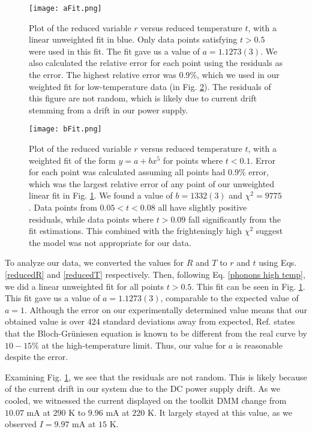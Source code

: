 \documentclass[11pt,letterpaper]{article}
\begin{document}
\begin{figure}
\centerline{\texttt{[image: aFit.png]}}
\caption{Plot of the reduced variable $r$ versus reduced temperature $t$, with a linear unweighted fit in blue. Only data points satisfying $t > 0.5$ were used in this fit. The fit gave us a value of $a = 1.1273(3)$. We also calculated the relative error for each point using the residuals as the error. The highest relative error was $0.9\%$, which we used in our weighted fit for low-temperature data (in Fig. \ref{bFit}). The residuals of this figure are not random, which is likely due to current drift stemming from a drift in our power supply.} \label{aFit}
\end{figure}

\begin{figure}
\centerline{\texttt{[image: bFit.png]}}
\caption{Plot of the reduced variable $r$ versus reduced temperature $t$, with a weighted fit of the form $y = a + bx^5$ for points where $t < 0.1$. Error for each point was calculated assuming all points had $0.9\%$ error, which was the largest relative error of any point of our unweighted linear fit in Fig. \ref{aFit}. We found a value of $b = 1332(3)$ and $\chi^2 = 9775$. Data points from $0.05 < t < 0.08$ all have slightly positive residuals, while data points where $t > 0.09$ fall significantly from the fit estimations. This combined with the frighteningly high $\chi^2$ suggest the model was not appropriate for our data.} \label{bFit}
\end{figure}

To analyze our data, we converted the values for $R$ and $T$ to $r$ and $t$ using Eqs. \ref{reducedR} and \ref{reducedT} respectively. Then, following Eq. \ref{phonons high temp}, we did a linear unweighted fit for all points $t > 0.5$. This fit can be seen in Fig. \ref{aFit}. This fit gave us a value of $a = 1.1273(3)$, comparable to the expected value of $a = 1$. Although the error on our experimentally determined value means that our obtained value is over 424 standard deviations away from expected, Ref. \cite{Thomas} states that the Bloch-Grüniesen equation is known to be different from the real curve by $10-15\%$ at the high-temperature limit. Thus, our value for $a$ is reasonable despite the error.

Examining Fig. \ref{aFit}, we see that the residuals are not random. This is likely because of the current drift in our system due to the DC power supply drift. As we cooled, we witnessed the current displayed on the toolkit DMM change from $10.07$ mA at $290$ K to $9.96$ mA at $220$ K. It largely stayed at this value, as we observed $I = 9.97$ mA at $15$ K.
\end{document}

